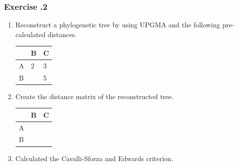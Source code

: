 \subsubsection*{Exercise \thesection.2}
\begin{enumerate}
\item Reconstruct a phylogenetic tree by using UPGMA and the following pre-calculated distances.
\begin{table}[H]
\centering
\begin{tabular}{|l|l|l|}
\hline
     & B & C \\ \hline
A  & 2 & 3 \\ \hline
B   &   & 5 \\ \hline
\end{tabular}
\end{table}

\item Create the distance matrix of the reconstructed tree. 
\begin{table}[H]
\centering
\begin{tabular}{|l|l|l|}
\hline
     & B & C \\ \hline
A  &  &  \\ \hline
B   &   &  \\ \hline
\end{tabular}
\end{table}

\item Calculated the Cavalli-Sforza and Edwards criterion.

\end{enumerate}

\bigskip 

%
